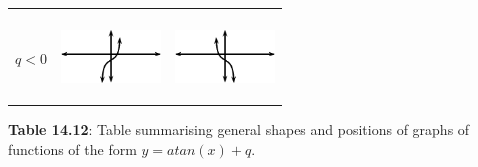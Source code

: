 \begin{center}
\begin{xtabular*}{\mytablewidth}[t]{|p{10\mystarwidth}|p{10\mystarwidth}|p{10\mystarwidth}|}
\begin{center}
\vspace{2pt}
\vspace{.1in}
\end{center}    
\tabularnewline{}
    $q<0$
    &
\setcounter{subfigure}{0}
\label{m39414*id91030}
\begin{center}
\label{m39414*id91030!!!underscore!!!media}\label{m39414*id91030!!!underscore!!!printimage}\includegraphics[width=100px]{col11306.imgs/m39414_MG10C15_036.png} %
\vspace{2pt}
\vspace{.1in}
\end{center}    
    &
\setcounter{subfigure}{0}
\label{m39414*id91042}
\begin{center}
\label{m39414*id91042!!!underscore!!!media}\label{m39414*id91042!!!underscore!!!printimage}\includegraphics[width=100px]{col11306.imgs/m39414_MG10C15_037.png} %
\vspace{2pt}
\vspace{.1in}
\end{center}    
\tabularnewline{}
\end{xtabular*}
\end{center}
\begin{center}{\small\bfseries Table 14.12}: Table summarising general shapes and positions of graphs of functions of the form $y=atan(x)+q$.\end{center}
\par

